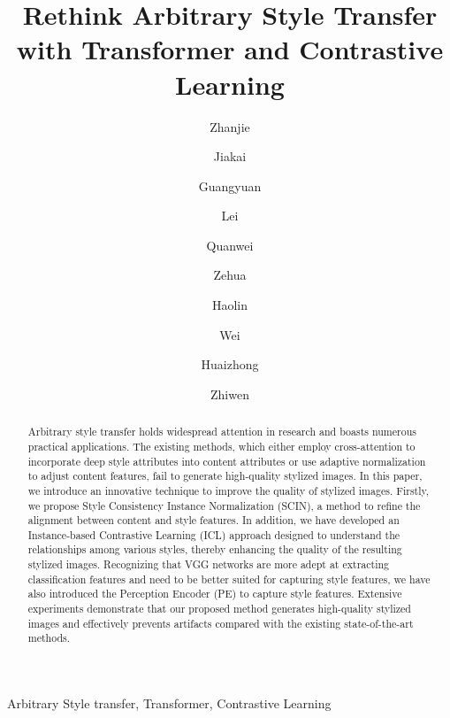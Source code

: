 \documentclass[times,twocolumn,final,authoryear]{elsarticle}
\begin{document}
\begin{frontmatter}

\title{Rethink Arbitrary Style Transfer with Transformer and Contrastive Learning}

\author[1]{Zhanjie } 
\author[1]{Jiakai }
\author[1]{Guangyuan }
\author[1]{Lei }
\author[1]{Quanwei }
\author[1]{Zehua }
\author[1]{Haolin }
\author[1]{Wei }
\author[1]{Huaizhong }
\author[2]{Zhiwen }
\address[1]{College of Computer Science and Technology, Zhejiang University, No. 38, Zheda Road, Hangzhou 310000, China}
\address[2]{College of Computer Science and Technology, Zhejiang Gongshang University, No. 18 Xuezheng Street, Hangzhou 310018, China}

\begin{abstract}
Arbitrary style transfer holds widespread attention in research and boasts numerous practical applications. The existing methods, which either employ cross-attention to incorporate deep style attributes into content attributes or use adaptive normalization to adjust content features, fail to generate high-quality stylized images. In this paper, we introduce an innovative technique to improve the quality of stylized images. Firstly, we propose Style Consistency Instance Normalization (SCIN), a method to refine the alignment between content and style features. In addition, we have developed an Instance-based Contrastive Learning (ICL) approach designed to understand the relationships among various styles, thereby enhancing the quality of the resulting stylized images. Recognizing that VGG networks are more adept at extracting classification features and need to be better suited for capturing style features, we have also introduced the Perception Encoder (PE) to capture style features. Extensive experiments demonstrate that our proposed method generates high-quality stylized images and effectively prevents artifacts compared with the existing state-of-the-art methods.
\end{abstract}

\begin{keyword}
	Arbitrary Style transfer, Transformer, Contrastive Learning
\end{keyword}


\end{frontmatter}
\end{document}
